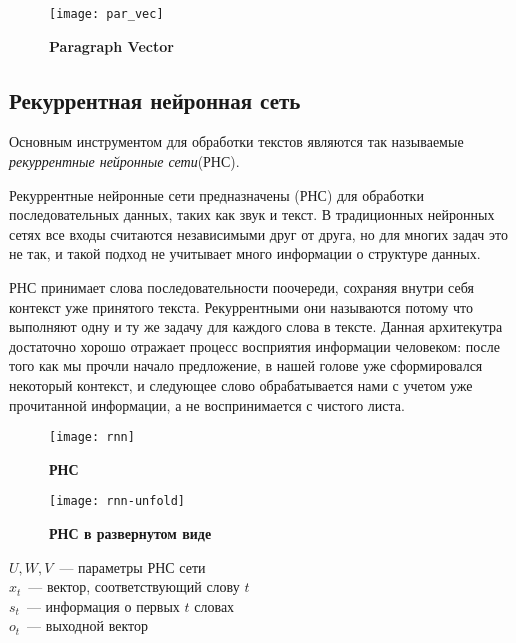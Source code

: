 \begin{figure}[h]
\texttt{[image: par\_vec]}
\caption{\textbf{Paragraph Vector}}
\label{fig:par_vec}
\end{figure}

\subsection{Рекуррентная нейронная сеть} \label{lstm}
Основным инструментом для обработки текстов являются так называемые \emph{рекуррентные нейронные сети}(РНС)\cite{Goller96learningtask-dependent}.

Рекуррентные нейронные сети предназначены (РНС) для обработки последовательных данных, таких как звук и текст. В традиционных нейронных сетях все входы считаются независимыми друг от друга, но для многих задач это не так, и такой подход не учитывает много информации о структуре данных.

РНС принимает слова последовательности поочереди, сохраняя внутри себя контекст уже принятого текста. Рекуррентными они называются потому что выполняют одну и ту же задачу для каждого слова в тексте. Данная архитекутра достаточно хорошо отражает процесс восприятия информации человеком: после того как мы прочли начало предложение, в нашей голове уже сформировался некоторый контекст, и следующее слово обрабатывается нами с учетом уже прочитанной информации, а не воспринимается с чистого листа.

\begin{figure}[h]
\texttt{[image: rnn]}
\caption{\textbf{РНС}}
\label{fig:rnn}
\end{figure}

\begin{figure}[h]
\texttt{[image: rnn-unfold]}
\caption{\textbf{РНС в развернутом виде}}
\label{fig:rnn-unfold}
\end{figure}

\noindent $U, W, V$~--- параметры РНС сети\\
$x_t$~--- вектор, соответствующий слову $t$ \\
$s_t$~--- информация о первых $t$ словах \\
$o_t$~--- выходной вектор

